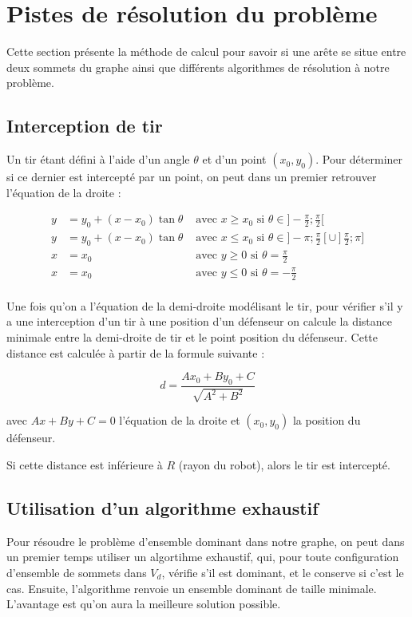 \documentclass[12pt]{article}
\begin{document}
\section{Pistes de résolution du problème}

Cette section présente la méthode de calcul pour savoir si une arête se situe entre deux sommets du graphe ainsi que différents algorithmes de résolution à notre problème.

\subsection{Interception de tir}
Un tir étant défini à l'aide d'un angle $\theta$ et d'un point $(x_0, y_0)$. Pour déterminer si ce dernier est intercepté par un point, on peut dans un premier retrouver l'équation de la droite :

\begin{align*}
y & =  y_0 + (x - x_0)\tan \theta & \text{ avec $x \geqslant x_0$ si } \theta \in ]-\frac{\pi}{2}; \frac{\pi}{2} [ \\
y & = y_0 + (x - x_0)\tan \theta & \text{ avec $x \leqslant x_0$ si } \theta \in ]-\pi; \frac{\pi}{2}[ \cup ]\frac{\pi}{2}; \pi ] \\
x & = x_0  & \text{ avec $y \geqslant 0$ si } \theta = \frac{\pi}{2} \\
x & = x_0  & \text{ avec $y \leqslant 0$ si } \theta = -\frac{\pi}{2} \\
\end{align*}

Une fois qu'on a l'équation de la demi-droite modélisant le tir, pour vérifier s'il y a une interception d'un tir à une position d'un défenseur on calcule la distance minimale entre la demi-droite de tir et le point position du défenseur. Cette distance est calculée à partir de la formule suivante :

\begin{equation*}
  d = \frac{Ax_0 + By_0 + C}{\sqrt{A^2+B^2}}
\end{equation*}

avec $Ax+By+C = 0$ l'équation de la droite et $(x_0, y_0)$ la position du défenseur.

 Si cette distance est inférieure à $R$ (rayon du robot), alors le tir est intercepté.

\subsection{Utilisation d'un algorithme exhaustif}
Pour résoudre le problème d'ensemble dominant dans notre graphe, on peut dans un premier temps utiliser un algortihme exhaustif, qui, pour toute configuration d'ensemble de sommets dans $V_d$, vérifie s'il est dominant, et le conserve si c'est le cas. Ensuite, l'algorithme renvoie un ensemble dominant de taille minimale. L'avantage est qu'on aura la meilleure solution possible.
\end{document}
